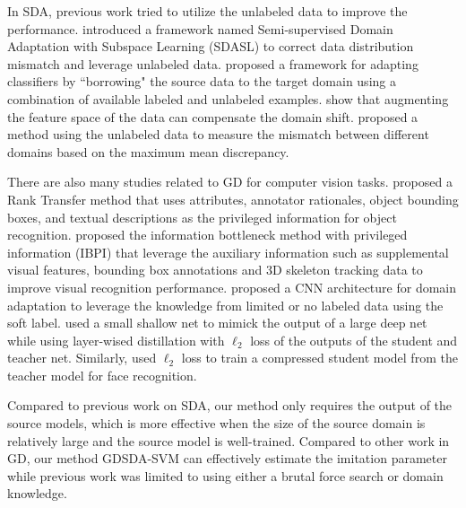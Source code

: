 In SDA, previous work tried to utilize the unlabeled data to improve the performance.  \cite{yao2015semi} introduced a framework named Semi-supervised Domain Adaptation with Subspace Learning (SDASL) to correct data distribution mismatch and leverage unlabeled data. \cite{Donahue_2013_CVPR} proposed a framework for adapting classifiers by ``borrowing" the source data to the target domain using a combination of available labeled and unlabeled examples. \cite{daume2010frustratingly} show that augmenting the feature space of the data can compensate the domain shift.
\cite{duan2009domain} proposed a method using the unlabeled data to measure the mismatch between different domains based on the maximum mean discrepancy. %

There are also many studies related to GD for computer vision tasks. \cite{Sharmanska_2013_ICCV} proposed a Rank Transfer method that uses attributes, annotator
rationales, object bounding boxes, and textual descriptions as the privileged information for object recognition. \cite{Motiian_2016_CVPR} proposed {the information bottleneck method with privileged information (IBPI)} that leverage the auxiliary information such as supplemental visual features, bounding box annotations and 3D skeleton tracking data to improve visual recognition performance. \cite{Tzeng_2015_ICCV} proposed a CNN architecture for domain adaptation to leverage the knowledge from limited or no labeled data using the soft label. \cite{urban2016deep} used a small shallow net to mimick the output of a large deep net while using layer-wised distillation with $\ell_2$ loss of the outputs of the student and teacher net. Similarly, \cite{luo2016face} used $\ell_2$ loss to train a compressed student model from the teacher model for face recognition. 

Compared to previous work on SDA, our method only requires the output of the source models, which is more effective when the size of the source domain is relatively large and the source model is well-trained. Compared to other work in GD, our method GDSDA-SVM can effectively estimate the imitation parameter while previous work was limited to using either a brutal force search or domain knowledge.

